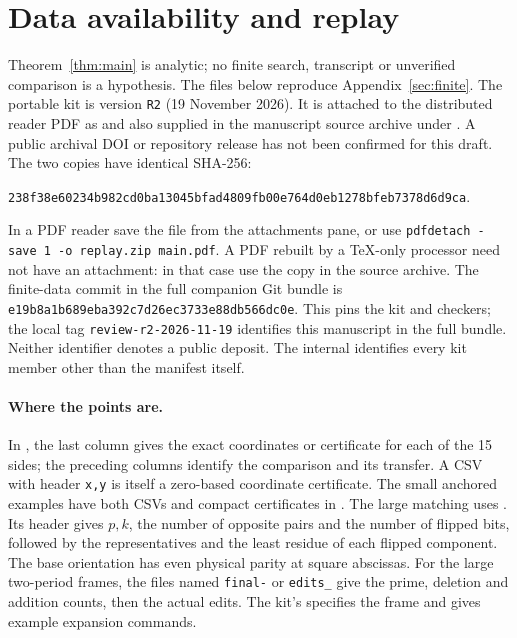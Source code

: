\section{Data availability and replay}\label{sec:reproduction}
Theorem~\ref{thm:main} is analytic; no finite search, transcript or unverified comparison is a hypothesis. The files below reproduce Appendix~\ref{sec:finite}. The portable kit is version \texttt{R2} (19 November 2026). It is attached to the distributed reader PDF as  and also supplied in the manuscript source archive under . A public archival DOI or repository release has not been confirmed for this draft. The two copies have identical SHA-256:
\begin{center}\small\texttt{238f38e60234b982cd0ba13045bfad4809fb00e764d0eb1278bfeb7378d6d9ca}.\end{center}
In a PDF reader save the file from the attachments pane, or use \texttt{pdfdetach -save 1 -o replay.zip main.pdf}. A PDF rebuilt by a TeX-only processor need not have an attachment: in that case use the copy in the source archive. The finite-data commit in the full companion Git bundle is \texttt{e19b8a1b689eba392c7d26ec3733e88db566dc0e}. This pins the kit and checkers; the local tag \texttt{review-r2-2026-11-19} identifies this manuscript in the full bundle. Neither identifier denotes a public deposit. The internal  identifies every kit member other than the manifest itself.

\paragraph{Where the points are.} In , the last column gives the exact coordinates or certificate for each of the 15 sides; the preceding columns identify the comparison and its transfer. A CSV with header \texttt{x,y} is itself a zero-based coordinate certificate. The small anchored examples have both CSVs and compact certificates in . The large matching uses . Its header gives $p,k$, the number of opposite pairs and the number of flipped bits, followed by the representatives and the least residue of each flipped component. The base orientation has even physical parity at square abscissas. For the large two-period frames, the files named \texttt{final-} or \texttt{edits\_} give the prime, deletion and addition counts, then the actual edits. The kit's  specifies the frame and gives example expansion commands.

